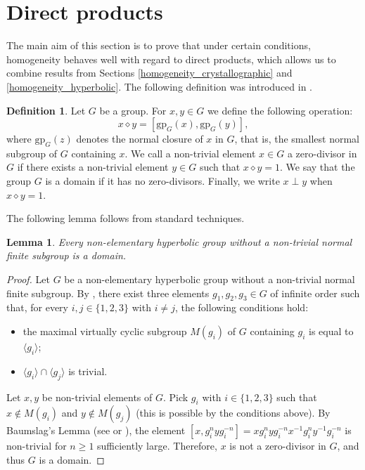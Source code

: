 \documentclass[a4paper, 11pt]{amsart}
\newtheorem{lemme}[te]{Lemma}
\theoremstyle{definition}
\newtheorem{de}[te]{Definition}
\theoremstyle{remark}
\renewcommand{\geq}{\geqslant}
\begin{document}
\section{Direct products}\label{direct_products}

The main aim of this section is to prove that under certain conditions, homogeneity behaves well with regard to direct products, which allows us to combine results from Sections \ref{homogeneity_crystallographic} and \ref{homogeneity_hyperbolic}. The following definition was introduced in \cite{alg_geom_over_groups3}.

\begin{de} Let $G$ be a group. For $x, y \in G$ we define the following operation:
	$$x \diamond y = [\mathrm{gp}_G(x), \mathrm{gp}_G(y)],$$
where $\mathrm{gp}_G(z)$ denotes the normal closure of $x$ in $G$, that is, the smallest normal subgroup of $G$ containing $x$. We call a non-trivial element $x \in G$ a zero-divisor in $G$ if there exists a non-trivial element
$y \in G$ such that $x \diamond y = 1$. We say that the group $G$ is a domain if it has no zero-divisors. Finally, we write $x \perp y$ when $x \diamond y = 1$.
\end{de} 

The following lemma follows from standard techniques.

\begin{lemme}\label{standard}Every non-elementary hyperbolic group without a non-trivial normal finite subgroup is a domain. 
\end{lemme}

\begin{proof}
Let $G$ be a non-elementary hyperbolic group without a non-trivial normal finite subgroup. By \cite{ol93}, there exist three elements $g_1,g_2,g_3\in G$ of infinite order such that, for every $i,j\in\lbrace 1,2,3\rbrace$ with $i\neq j$, the following conditions hold:
\begin{itemize}
    \item the maximal virtually cyclic subgroup $M(g_i)$ of $G$ containing $g_i$ is equal to $\langle g_i\rangle$;
    \item $\langle g_i\rangle \cap \langle g_j\rangle$ is trivial.
\end{itemize}
Let $x,y$ be non-trivial elements of $G$. Pick $g_i$ with $i\in\lbrace 1,2,3\rbrace$ such that $x\notin M(g_i)$ and $y\notin M(g_j)$ (this is possible by the conditions above). By Baumslag's Lemma (see \cite[Corollary 2.20]{And20} or \cite{ol93}), the element $[x,g_i^nyg_i^{-n}]=xg_i^nyg_i^{-n}x^{-1}g_i^ny^{-1}g_i^{-n}$ is non-trivial for $n\geq 1$ sufficiently large. Therefore, $x$ is not a zero-divisor in $G$, and thus $G$ is a domain.
\end{proof}
\end{document}
